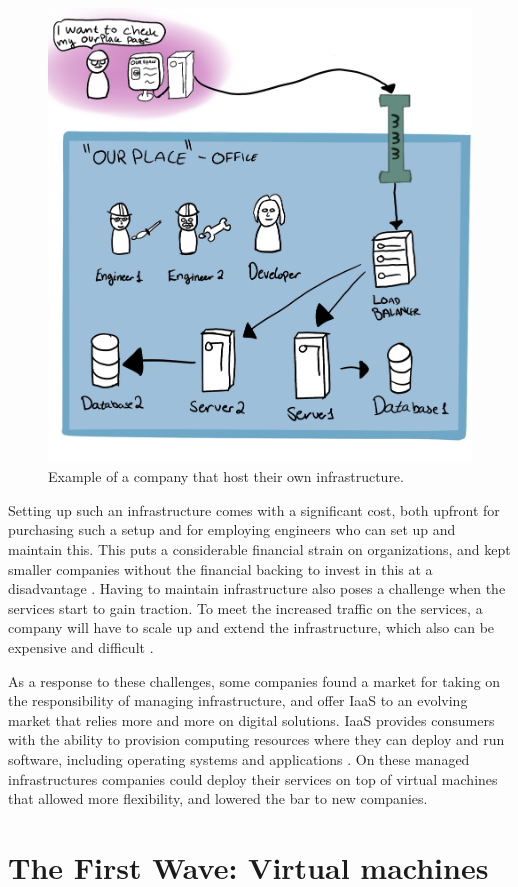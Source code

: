 \documentclass[
  table]{report}
\begin{document}
\begin{figure}[H]
\centering
  \includegraphics[width=0.7\columnwidth]{assets/pre-wave.jpg}
  \caption{Example of a company that host their own infrastructure.}
  \label{fig:myspeis}
\end{figure}

Setting up such an infrastructure comes with a significant cost, both
upfront for purchasing such a setup and for employing engineers who can
set up and maintain this. This puts a considerable financial strain on
organizations, and kept smaller companies without the financial backing
to invest in this at a disadvantage \citep{etroEconomicImpactCloud2009}.
Having to maintain infrastructure also poses a challenge when the
services start to gain traction. To meet the increased traffic on the
services, a company will have to scale up and extend the infrastructure,
which also can be expensive and difficult
\citep{armbrustViewCloudComputing2010}.

As a response to these challenges, some companies found a market for
taking on the responsibility of managing infrastructure, and offer
\ac{IaaS} to an evolving market that relies more and more on digital
solutions. \ac{IaaS} provides consumers with the ability to provision
computing resources where they can deploy and run software, including
operating systems and applications \citep{nist-def}. On these managed
infrastructures companies could deploy their services on top of virtual
machines that allowed more flexibility, and lowered the bar to new
companies.

\section{The First Wave: Virtual machines}
\label{sect:first-wave}
\end{document}

